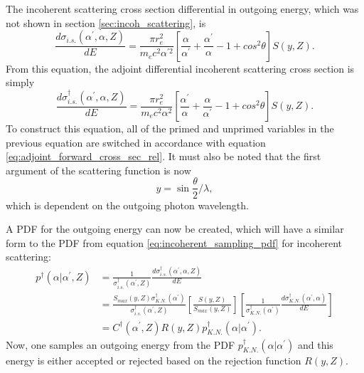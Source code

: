The incoherent scattering cross section differential in outgoing energy, which
was not shown in section \ref{sec:incoh_scattering}, is 
\begin{equation}
  \frac{d\sigma_{i.s.}(\alpha^{'},\alpha,Z)}{dE} = 
  \frac{\pi r_e^2}{m_ec^2 \alpha^{'2}}
  \left[\frac{\alpha}{\alpha^{'}} + \frac{\alpha^{'}}{\alpha} - 1 + cos^2\theta
    \right] S(y,Z).
\end{equation}
From this equation, the adjoint differential incoherent scattering cross section
is simply
\begin{equation}
  \frac{d\sigma_{i.s.}^{\dagger}(\alpha^{'},\alpha,Z)}{dE} = 
  \frac{\pi r_e^2}{m_ec^2 \alpha^{2}}
  \left[\frac{\alpha^{'}}{\alpha} + \frac{\alpha}{\alpha^{'}} - 1 + cos^2\theta
    \right] S(y,Z).
  \label{eq:diff_adjoint_incoh_scatt_cross_sec_energy}
\end{equation}
To construct this equation, all of the primed and unprimed 
variables in the previous equation are switched in accordance with equation
\ref{eq:adjoint_forward_cross_sec_rel}. It must also be noted that the first 
argument of the scattering function is now 
\begin{equation}
  y = \sin{\frac{\theta}{2}}/\lambda,
\end{equation} 
which is dependent on the outgoing photon wavelength.

A PDF for the outgoing energy can now be created, which will have a similar
form to the PDF from equation \ref{eq:incoherent_sampling_pdf} for 
incoherent scattering:
\begin{align}
  p^{\dagger}(\alpha|\alpha^{'},Z) & = \frac{1}{\sigma_{i.s.}^{\dagger}(\alpha^{'},Z)}
  \frac{d\sigma_{i.s.}^{\dagger}(\alpha^{'},\alpha,Z)}{dE} \nonumber \\
  & = \frac{S_{max}(y,Z)\sigma_{K.N.}^{\dagger}(\alpha^{'})}
       {\sigma_{i.s.}^{\dagger}(\alpha^{'},Z)} 
       \left[\frac{S(y,Z)}{S_{max}(y,Z)}\right]
       \left[\frac{1}{\sigma_{K.N.}^{\dagger}(\alpha^{'})}
         \frac{d\sigma_{K.N.}^{\dagger}(\alpha^{'},\alpha)}{dE}\right] \nonumber \\
  & = C^{\dagger}(\alpha^{'},Z)R(y,Z)p_{K.N.}^{\dagger}(\alpha|\alpha^{'}).
  \label{eq:adj_incoherent_sampling_pdf}
\end{align}
Now, one samples an outgoing energy from the PDF 
$p_{K.N.}^{\dagger}(\alpha|\alpha^{'})$ and this energy is either accepted or 
rejected based on the rejection function $R(y,Z)$.

